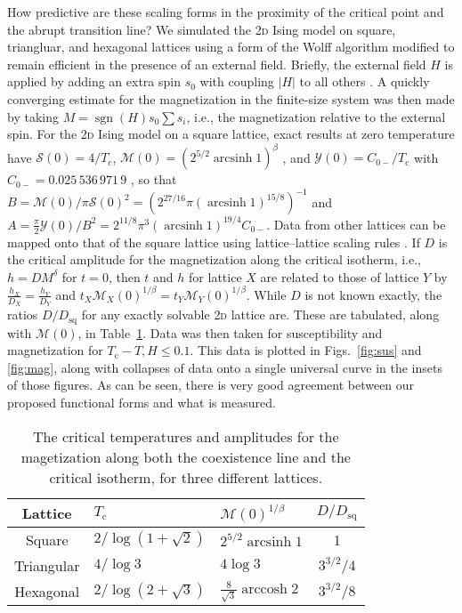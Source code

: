 \documentclass[aps,prl,preprint]{revtex4-1}
\def\arcsinh{\mathop{\mathrm{arcsinh}}\nolimits}
\def\arccosh{\mathop{\mathrm{arccosh}}\nolimits}
\def\sgn{\mathop{\mathrm{sgn}}\nolimits}
\def\c{\mathrm c}
\def\fM{\mathcal M}  %
\def\fX{\mathcal Y}  %
\def\fS{\mathcal S}  %
\def\sq{\mathrm{sq}}
\def\twodee{\textsc{2d} }
\begin{document}
How predictive are these scaling forms in the proximity of the critical point
and the abrupt transition line? We simulated the \twodee Ising model on square, triangluar, and hexagonal lattices using a form of the Wolff algorithm modified
to remain efficient in the presence of an external field. Briefly, the external field $H$ is applied by adding an extra spin $s_0$ with coupling $|H|$ to all others
\cite{dimitrovic.1991.finite}. A quickly converging estimate for the magnetization in the finite-size system was then made by taking $M=\sgn(H)s_0\sum s_i$, i.e., the magnetization relative to the external spin. For the \twodee Ising model on a square lattice, exact results at zero temperature have $\fS(0)=4/T_c$, $\fM(0)=(2^{5/2}\arcsinh1)^\beta$ \cite{onsager.1944.crystal}, and $\fX(0)=C_{0-}/T_\c$ with $C_{0-}=0.025\,536\,971\,9$
\cite{barouch.1973.susceptibility}, so that $B=\fM(0)/\pi\fS(0)^2=(2^{27/16}\pi(\arcsinh1)^{15/8})^{-1}$ and $A=\frac\pi2\fX(0)/B^2=2^{11/8}\pi^3(\arcsinh1)^{19/4}C_{0-}$. Data from other lattices can be mapped onto that of the square lattice using lattice--lattice scaling rules \cite{betts.1971.lattice}. If $D$ is the critical amplitude for the magnetization along the critical isotherm, i.e., $h=DM^\delta$ for $t=0$, then $t$ and $h$ for lattice $X$ are related to those of lattice $Y$ by $\frac{h_X}{D_X}=\frac{h_Y}{D_Y}$ and $t_X\fM_X(0)^{1/\beta}=t_Y\fM_Y(0)^{1/\beta}$. While $D$ is not known exactly, the ratios $D/D_\sq$ for any exactly solvable \twodee lattice are. These are tabulated, along with $\fM(0)$, in Table~\ref{tab:consts}.
Data was then taken for susceptibility and
magnetization for $T_\c-T,H\leq0.1$. This data is plotted in Figs.~\ref{fig:sus}
and \ref{fig:mag}, along with collapses of data onto a single universal curve
in the insets of those figures. As can be seen, there is very good agreement
between our proposed functional forms and what is measured.

\begin{table}
  \centering
  \begin{tabular}{c|llc}
    Lattice    & $T_\c$             & $\fM(0)^{1/\beta}$        & $D/D_\sq$   \\
    \hline %
    Square     & $2/\log(1+\sqrt2)$ & $2^{5/2}\arcsinh1$        & 1           \\
    Triangular & $4/\log3$          & $4\log3$                  & $3^{3/2}/4$ \\
    Hexagonal  & $2/\log(2+\sqrt3)$ & $\frac8{\sqrt3}\arccosh2$ & $3^{3/2}/8$
  \end{tabular}
  \caption{
    The critical temperatures and amplitudes for the magetization along both the coexistence line and the critical isotherm, for three different lattices.
  }
  \label{tab:consts}
\end{table}
\end{document}
